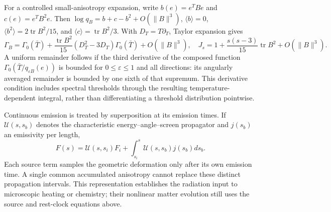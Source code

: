 For a controlled small-anisotropy expansion, write $b(e)=e^TBe$ and $c(e)=e^TB^2e$. Then
$\log q_B=b+c-b^2+O(\|B\|^3)$,
$\langle b\rangle=0$, $\langle b^2\rangle=2\operatorname{tr}B^2/15$, and
$\langle c\rangle=\operatorname{tr}B^2/3$.
With $D_T=T\partial_T$, Taylor expansion gives
\begin{equation}
 \Gamma_B=\Gamma_0(\bar T)+\frac{\operatorname{tr}B^2}{15}
             (D_T^2-3D_T)\Gamma_0(\bar T)+O(\|B\|^3),
 \quad
 J_s=1+\frac{s(s-3)}{15}\operatorname{tr}B^2+O(\|B\|^3).
 \label{ii:response_quadratic}
\end{equation}
A uniform remainder follows if the third derivative of the composed function
$\Gamma_0(\bar T/q_{\varepsilon B}(e))$ is bounded for $0\le\varepsilon\le1$ and all directions: its angularly averaged remainder is bounded by one sixth of that supremum. This derivative condition includes spectral thresholds through the resulting temperature-dependent integral, rather than differentiating a threshold distribution pointwise.

Continuous emission is treated by superposition at its emission times. If $\mathcal U(s,s_b)$ denotes the characteristic energy--angle--screen propagator and $j(s_b)$ an emissivity per length,
\begin{equation}
 F(s)=\mathcal U(s,s_i)F_i+\int_{s_i}^{s}\mathcal U(s,s_b)j(s_b)ds_b.
 \label{ii:causal_emission}
\end{equation}
Each source term samples the geometric deformation only after its own emission time. A single common accumulated anisotropy cannot replace these distinct propagation intervals. This representation establishes the radiation input to microscopic heating or chemistry; their nonlinear matter evolution still uses the source and rest-clock equations above.
